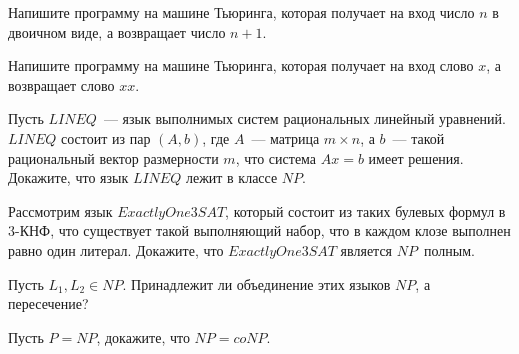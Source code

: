 \setcounter{curtask}{13}


\begin{task}
    Напишите программу на машине Тьюринга, которая получает на вход число $n$ в
    двоичном виде, а возвращает число $n + 1$.
\end{task}

\begin{task}
    Напишите программу на машине Тьюринга, которая получает на вход слово $x$, а
    возвращает слово $xx$.
\end{task}

\begin{task}
    Пусть $LINEQ$~--- язык выполнимых систем рациональных линейный уравнений. $LINEQ$
    состоит из пар $(A, b)$, где $A$~--- матрица $m \times n$, а $b$~--- такой
    рациональный вектор размерности $m$, что система $Ax = b$ имеет
    решения. Докажите, что язык $LINEQ$ лежит в классе $NP$.
\end{task}

\begin{task}
    Рассмотрим язык $Exactly One 3SAT$, который состоит из таких булевых формул в
    $3$-КНФ, что существует такой выполняющий набор, что в каждом клозе выполнен
    равно один литерал. Докажите, что $Exactly One 3SAT$ является $NP$~полным.
\end{task}

\begin{task}
    Пусть $L_1, L_2 \in NP$. Принадлежит ли объединение этих языков $NP$, а
    пересечение?
\end{task}

\begin{task}
    Пусть $P = NP$, докажите, что $NP = coNP$.
\end{task}
